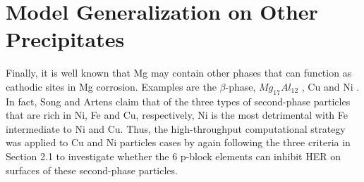 \section{Model Generalization on Other Precipitates}

Finally, it is well known that Mg may contain other phases that can function as cathodic sites in Mg corrosion. Examples are the $\beta$-phase, $Mg_{17}Al_{12}$ \cite{guo2017influence}, Cu \cite{kawabata2012influence} and Ni \cite{hanawalt1942corrosion}. In fact, Song and Artens \cite{song2003understanding} claim that of the three types of second-phase particles that are rich in Ni, Fe and Cu, respectively, Ni is the most detrimental with Fe intermediate to Ni and Cu. Thus, the high-throughput computational strategy was applied to Cu and Ni particles cases by again following the three criteria in Section 2.1 to investigate whether the 6 p-block elements can inhibit HER on surfaces of these second-phase particles. 

